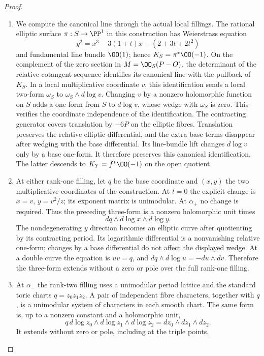 \begin{proof}

\begin{enumerate}[label={$\langle1\rangle$\arabic*.},leftmargin=*]
\item We compute the canonical line through the actual local fillings.
The rational elliptic surface $\pi:S\to\PP^1$ in this construction
has Weierstrass equation
\[
y^2=x^3-3(1+t)x+(2+3t+2t^2)
\]
and fundamental line bundle $\OO(1)$; hence
$K_S=\pi^*\OO(-1)$. On the complement of the zero section in
$M=\OO_S(P-O)$, the determinant of the relative cotangent sequence
identifies its canonical line with the pullback of $K_S$.
In a local multiplicative coordinate $v$, this identification sends
a local two-form $\omega_S$ to $\omega_S\wedge d\log v$.
Changing $v$ by a nonzero holomorphic function on $S$ adds a
one-form from $S$ to $d\log v$, whose wedge with $\omega_S$ is zero.
This verifies the coordinate independence of the identification.
The contracting generator covers translation by $-6P$ on the
elliptic fibres. Translation preserves the relative elliptic
differential, and the extra base terms disappear after wedging
with the base differential. Its line-bundle lift changes $d\log v$
only by a base one-form. It therefore preserves this canonical
identification. The latter descends to
$K_Y=f^*\OO(-1)$ on the open quotient.

\item At either rank-one filling, let $q$ be the base coordinate and
$(x,y)$ the two multiplicative coordinates of the construction.
At $t=0$ the explicit change is $x=v$, $y=v^2/z$; its exponent
matrix is unimodular. At $\alpha_+$ no change is required.
Thus the preceding three-form is a nonzero holomorphic unit times
\[
dq\wedge d\log x\wedge d\log y.
\]
The nondegenerating $y$ direction becomes an elliptic curve after
quotienting by its contracting period. Its logarithmic differential
is a nonvanishing relative one-form; changes by a base differential
do not affect the displayed wedge. At a double curve the equation
is $uv=q$, and
$dq\wedge d\log u=-du\wedge dv$. Therefore the three-form extends
without a zero or pole over the full rank-one filling.

\item At $\alpha_-$ the rank-two filling uses a unimodular period lattice
and the standard toric charts $q=z_0z_1z_2$. A pair of independent
fibre characters, together with $q$, is a unimodular system of
characters in each smooth chart. The same form is, up to a nonzero
constant and a holomorphic unit,
\[
q\,d\log z_0\wedge d\log z_1\wedge d\log z_2
=dz_0\wedge dz_1\wedge dz_2.
\]
It extends without zero or pole, including at the triple points.


\end{enumerate}
\end{proof}
